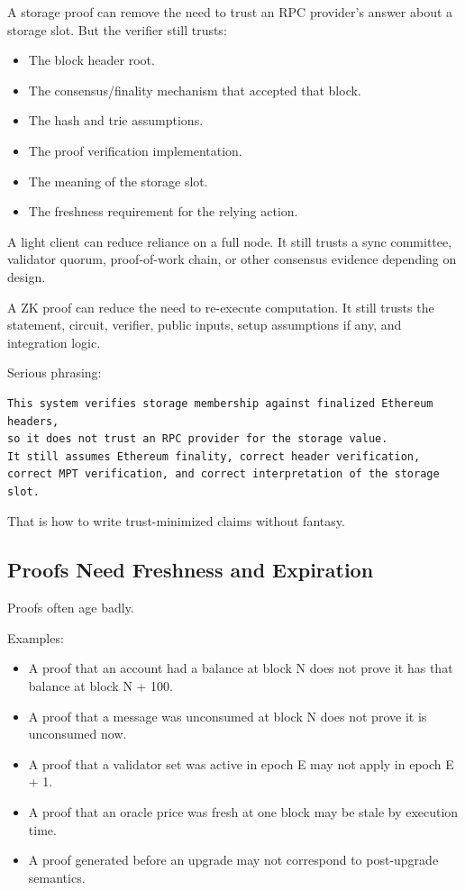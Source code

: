 A storage proof can remove the need to trust an RPC provider's answer
about a storage slot. But the verifier still trusts:

\begin{itemize}
\tightlist
\item
  The block header root.
\item
  The consensus/finality mechanism that accepted that block.
\item
  The hash and trie assumptions.
\item
  The proof verification implementation.
\item
  The meaning of the storage slot.
\item
  The freshness requirement for the relying action.
\end{itemize}

A light client can reduce reliance on a full node. It still trusts a
sync committee, validator quorum, proof-of-work chain, or other
consensus evidence depending on design.

A ZK proof can reduce the need to re-execute computation. It still
trusts the statement, circuit, verifier, public inputs, setup
assumptions if any, and integration logic.

Serious phrasing:

\begin{lstlisting}
This system verifies storage membership against finalized Ethereum headers,
so it does not trust an RPC provider for the storage value.
It still assumes Ethereum finality, correct header verification,
correct MPT verification, and correct interpretation of the storage slot.
\end{lstlisting}

That is how to write trust-minimized claims without fantasy.

\subsection{Proofs Need Freshness and Expiration}

Proofs often age badly.

Examples:

\begin{itemize}
\tightlist
\item
  A proof that an account had a balance at block N does not prove it has
  that balance at block N + 100.
\item
  A proof that a message was unconsumed at block N does not prove it is
  unconsumed now.
\item
  A proof that a validator set was active in epoch E may not apply in
  epoch E + 1.
\item
  A proof that an oracle price was fresh at one block may be stale by
  execution time.
\item
  A proof generated before an upgrade may not correspond to post-upgrade
  semantics.
\end{itemize}

